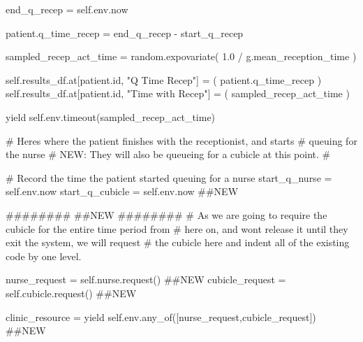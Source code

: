 \documentclass[
  letterpaper,
  DIV=11,
  numbers=noendperiod]{scrreprt}
\newenvironment{Shaded}{}{}
\newcommand{\BuiltInTok}[1]{\textcolor[rgb]{0.84,0.23,0.29}{#1}}
\newcommand{\CommentTok}[1]{\textcolor[rgb]{0.42,0.45,0.49}{#1}}
\newcommand{\ControlFlowTok}[1]{\textcolor[rgb]{0.84,0.23,0.29}{#1}}
\newcommand{\FloatTok}[1]{\textcolor[rgb]{0.00,0.36,0.77}{#1}}
\newcommand{\NormalTok}[1]{\textcolor[rgb]{0.14,0.16,0.18}{#1}}
\newcommand{\OperatorTok}[1]{\textcolor[rgb]{0.14,0.16,0.18}{#1}}
\newcommand{\StringTok}[1]{\textcolor[rgb]{0.01,0.18,0.38}{#1}}
\newcommand{\VariableTok}[1]{\textcolor[rgb]{0.89,0.38,0.04}{#1}}
\begin{document}
\begin{tcolorbox}
\begin{Shaded}
\begin{Highlighting}[]
\NormalTok{            end\_q\_recep }\OperatorTok{=} \VariableTok{self}\NormalTok{.env.now}

\NormalTok{            patient.q\_time\_recep }\OperatorTok{=}\NormalTok{ end\_q\_recep }\OperatorTok{{-}}\NormalTok{ start\_q\_recep}

\NormalTok{            sampled\_recep\_act\_time }\OperatorTok{=}\NormalTok{ random.expovariate(}
                \FloatTok{1.0} \OperatorTok{/}\NormalTok{ g.mean\_reception\_time}
\NormalTok{            )}

            \VariableTok{self}\NormalTok{.results\_df.at[patient.}\BuiltInTok{id}\NormalTok{, }\StringTok{"Q Time Recep"}\NormalTok{] }\OperatorTok{=}\NormalTok{ (}
\NormalTok{                 patient.q\_time\_recep}
\NormalTok{            )}
            \VariableTok{self}\NormalTok{.results\_df.at[patient.}\BuiltInTok{id}\NormalTok{, }\StringTok{"Time with Recep"}\NormalTok{] }\OperatorTok{=}\NormalTok{ (}
\NormalTok{                 sampled\_recep\_act\_time}
\NormalTok{            )}

            \ControlFlowTok{yield} \VariableTok{self}\NormalTok{.env.timeout(sampled\_recep\_act\_time)}

        \CommentTok{\# Here\textquotesingle{}s where the patient finishes with the receptionist, and starts}
        \CommentTok{\# queuing for the nurse}
        \CommentTok{\# NEW: They will also be queueing for a cubicle at this point.}
        \CommentTok{\#}

        \CommentTok{\# Record the time the patient started queuing for a nurse}
\NormalTok{        start\_q\_nurse }\OperatorTok{=} \VariableTok{self}\NormalTok{.env.now}
\NormalTok{        start\_q\_cubicle }\OperatorTok{=} \VariableTok{self}\NormalTok{.env.now }\CommentTok{\#\#NEW}

        \CommentTok{\#\#\#\#\#\#\#\#}
        \CommentTok{\#\#NEW}
        \CommentTok{\#\#\#\#\#\#\#\#}
        \CommentTok{\# As we are going to require the cubicle for the entire time period from}
        \CommentTok{\# here on, and won\textquotesingle{}t release it until they exit the system, we will request}
        \CommentTok{\# the cubicle here and indent all of the existing code by one level.}

\NormalTok{        nurse\_request }\OperatorTok{=} \VariableTok{self}\NormalTok{.nurse.request()  }\CommentTok{\#\#NEW}
\NormalTok{        cubicle\_request }\OperatorTok{=} \VariableTok{self}\NormalTok{.cubicle.request() }\CommentTok{\#\#NEW}

\NormalTok{        clinic\_resource }\OperatorTok{=} \ControlFlowTok{yield} \VariableTok{self}\NormalTok{.env.any\_of([nurse\_request,cubicle\_request]) }\CommentTok{\#\#NEW}


\end{Highlighting}
\end{Shaded}
\end{tcolorbox}
\end{document}
